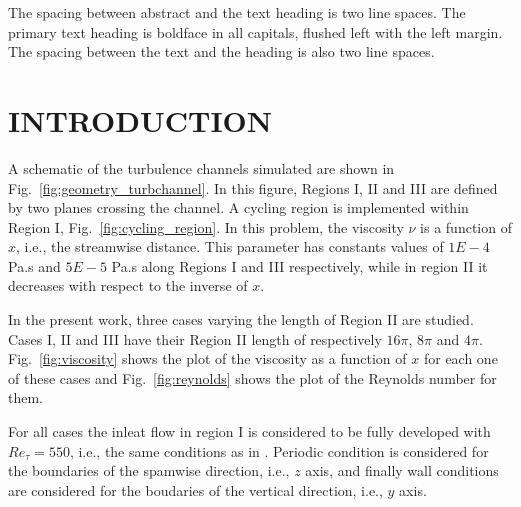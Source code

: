 \documentclass[twocolumn,10pt]{asme2e}
\begin{document}
\begin{nomenclature}
\end{nomenclature}

The spacing between abstract and the text heading is two line spaces.  The primary text heading is  boldface in all capitals, flushed left with the left margin.  The spacing between the  text and the heading is also two line spaces.

\section*{INTRODUCTION}

A schematic of the turbulence channels simulated are shown in Fig.~\ref{fig:geometry_turbchannel}. In this figure, Regions I, II and III are defined by two planes crossing the channel. A cycling region is implemented within Region I, Fig.~\ref{fig:cycling_region}.
In this problem, the viscosity \(\nu\) is a function of \(x\), i.e., the streamwise distance. This parameter has constants values of \(1E-4\) Pa.s and \(5E-5\) Pa.s along Regions I and III respectively, while in region II it decreases with respect to the inverse of \(x\).

In the present work, three cases varying the length of Region II are studied. Cases I, II and III have their Region II length of respectively \(16\pi\), \(8\pi\) and \(4\pi\). Fig.~\ref{fig:viscosity} shows the plot of the viscosity as a function of \(x\) for each one of these cases and Fig.~\ref{fig:reynolds} shows the plot of the Reynolds number for them.

For all cases the inleat flow in region I is considered to be fully developed with \(Re_{\tau}=550\), i.e., the same conditions as in \cite{hoyas2008}. Periodic condition is considered for the boundaries of the spamwise direction, i.e., \(z\) axis, and finally wall conditions are considered for the boudaries of the vertical direction, i.e., \(y\) axis.
\end{document}
